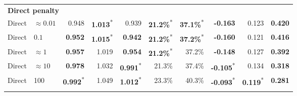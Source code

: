 \documentclass[10pt]{article}
\theoremstyle{definition}
\newcommand{\1}{\mathbf{1}}
\newcommand{\latesttext}[1]{\textcolor{latestPurple}{#1}}
\begin{document}
\begin{table}[!htbp]
{\begin{tabular}{llrrrrrrrr}
\multicolumn{10}{l}{\textbf{Direct penalty}} \\
\cmidrule(lr){1-10}
\latesttext{Direct} & \latesttext{$\approx0.01$} & \latesttext{0.948} & \latesttext{\textbf{1.013}\textsuperscript{*}} & \latesttext{0.939} & \latesttext{\textbf{21.2\%}\textsuperscript{*}} & \latesttext{\textbf{37.1\%}\textsuperscript{*}} & \latesttext{\textbf{-0.163}} & \latesttext{0.123} & \latesttext{\textbf{0.420}} \\
Direct & \latesttext{$0.1$} & \latesttext{\textbf{0.952}} & \latesttext{\textbf{1.015}\textsuperscript{*}} & \latesttext{\textbf{0.942}} & \latesttext{\textbf{21.2\%}\textsuperscript{*}} & \latesttext{\textbf{37.2\%}\textsuperscript{*}} & \textbf{-0.160} & 0.121 & \textbf{0.416} \\
Direct & \latesttext{$\approx1$} & \latesttext{\textbf{0.957}} & \latesttext{1.019} & \latesttext{\textbf{0.954}} & \latesttext{\textbf{21.2\%}\textsuperscript{*}} & \latesttext{37.2\%} & \textbf{-0.148} & 0.127 & \textbf{0.392} \\
Direct & \latesttext{$\approx10$} & \latesttext{\textbf{0.978}} & \latesttext{1.032} & \latesttext{\textbf{0.991}\textsuperscript{*}} & \latesttext{21.3\%} & \latesttext{37.4\%} & \textbf{-0.105}\textsuperscript{*} & 0.134 & \textbf{0.318} \\
Direct & 100 & \latesttext{\textbf{0.992}\textsuperscript{*}} & \latesttext{1.049} & \latesttext{\textbf{1.012}\textsuperscript{*}} & \latesttext{23.3\%} & \latesttext{40.3\%} & \textbf{-0.093}\textsuperscript{*} & \textbf{0.119}\textsuperscript{*} & \textbf{0.281} \\
\addlinespace[3pt]


\end{tabular}}
\end{table}
\end{document}
